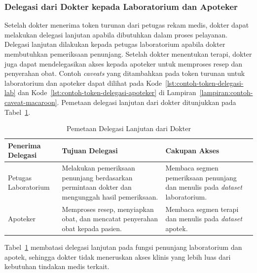 \subsubsection{Delegasi dari Dokter kepada Laboratorium dan Apoteker}
\label{subsec:delegasi-dari-dokter-kepada-laboratorium-dan-apoteker}

Setelah dokter menerima token turunan dari petugas rekam medis, dokter dapat melakukan delegasi lanjutan apabila dibutuhkan dalam proses pelayanan. Delegasi lanjutan dilakukan kepada petugas laboratorium apabila dokter membutuhkan pemeriksaan penunjang. Setelah dokter menentukan terapi, dokter juga dapat mendelegasikan akses kepada apoteker untuk memproses resep dan penyerahan obat.  Contoh \textit{caveats} yang ditambahkan pada token turunan untuk laboratorium dan apoteker dapat dilihat pada Kode~\ref{lst:contoh-token-delegasi-lab} dan Kode~\ref{lst:contoh-token-delegasi-apoteker} di Lampiran~\ref{lampiran:contoh-caveat-macaroon}. Pemetaan delegasi lanjutan dari dokter ditunjukkan pada Tabel~\ref{tab:pemetaan-delegasi-dokter-lanjutan}.

\begin{table}[H]
	\centering
	\caption{Pemetaan Delegasi Lanjutan dari Dokter}
	\label{tab:pemetaan-delegasi-dokter-lanjutan}
	\small
	\begin{tabular}{|p{}|p{}|p{}|}
		\hline
		\textbf{Penerima Delegasi} & \textbf{Tujuan Delegasi}                                                                        & \textbf{Cakupan Akses} \\ \hline

		Petugas Laboratorium
		                           & Melakukan pemeriksaan penunjang berdasarkan permintaan dokter dan mengunggah hasil pemeriksaan.
		                           & Membaca segmen pemeriksaan penunjang dan menulis pada \textit{dataset} laboratorium.                                     \\ \hline

		Apoteker
		                           & Memproses resep, menyiapkan obat, dan mencatat penyerahan obat kepada pasien.
		                           & Membaca segmen terapi dan menulis pada \textit{dataset} apotek.                                                          \\ \hline
	\end{tabular}
\end{table}

Tabel~\ref{tab:pemetaan-delegasi-dokter-lanjutan} membatasi delegasi lanjutan pada fungsi penunjang laboratorium dan apotek, sehingga dokter tidak meneruskan akses klinis yang lebih luas dari kebutuhan tindakan medis terkait.

